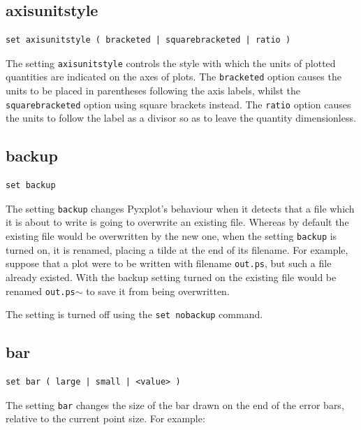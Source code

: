 \subsection{axisunitstyle}

\begin{verbatim}
set axisunitstyle ( bracketed | squarebracketed | ratio )
\end{verbatim}

The setting {\tt axisunitstyle} controls the style with which the units of
plotted quantities are indicated on the axes of plots. The {\tt bracketed}
option causes the units to be placed in parentheses following the axis labels,
whilst the {\tt square\-bracketed} option using square brackets instead.  The
{\tt ratio} option causes the units to follow the label as a divisor so as to
leave the quantity dimensionless.


\subsection{backup}

\begin{verbatim}
set backup
\end{verbatim}

The setting {\tt backup} changes Pyxplot's behaviour when it detects that a
file which it is about to write is going to overwrite an existing file. Whereas
by default the existing file would be overwritten by the new one, when the
setting {\tt backup} is turned on, it is renamed, placing a tilde at the end of
its filename. For example, suppose that a plot were to be written with filename
{\tt out.ps}, but such a file already existed.  With the backup setting turned
on the existing file would be renamed {\tt out.ps$\sim$} to save it from being
overwritten.

The setting is turned off using the {\tt set nobackup} command.


\subsection{bar}

\begin{verbatim}
set bar ( large | small | <value> )
\end{verbatim}

The setting {\tt bar} changes the size of the bar drawn on the end of the error
bars, relative to the current point size.  For example:

